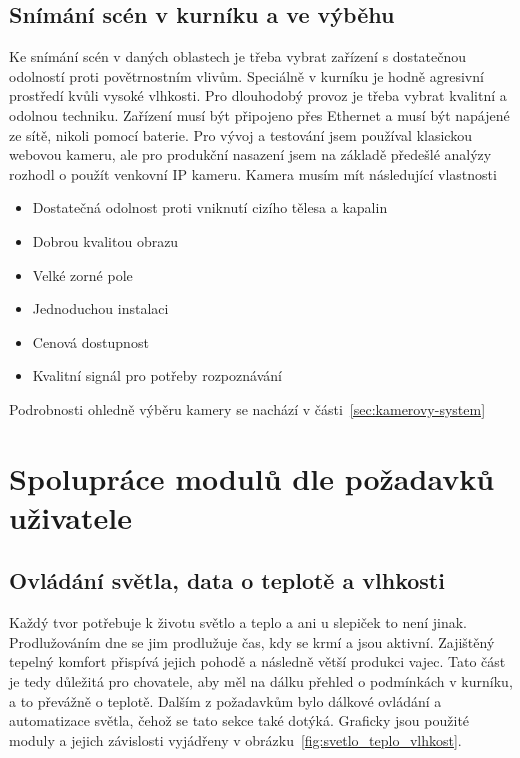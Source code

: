 \subsection{Snímání scén v kurníku a ve výběhu}
Ke snímání scén v daných oblastech je třeba vybrat zařízení s dostatečnou odolností proti povětrnostním vlivům.
Speciálně v kurníku je hodně agresivní prostředí kvůli vysoké vlhkosti.
Pro dlouhodobý provoz je třeba vybrat kvalitní a odolnou techniku.
Zařízení musí být připojeno přes Ethernet a musí být napájené ze sítě, nikoli pomocí baterie.
Pro vývoj a testování jsem používal klasickou webovou kameru, ale pro produkční nasazení jsem na základě předešlé analýzy rozhodl o použít venkovní IP kameru.
Kamera musím mít následující vlastnosti
\begin{itemize}
    \item Dostatečná odolnost proti vniknutí cizího tělesa a kapalin
    \item Dobrou kvalitou obrazu
    \item Velké zorné pole
    \item Jednoduchou instalaci
    \item Cenová dostupnost
    \item Kvalitní signál pro potřeby rozpoznávání
\end{itemize}
Podrobnosti ohledně výběru kamery se nachází v části~\ref{sec:kamerovy-system}

\clearpage
\section{Spolupráce modulů dle požadavků uživatele}\label{sec:schematicka-vyjadreni-zavislosti-jednotlivych-modulu}

\subsection{Ovládání světla, data o teplotě a vlhkosti}
Každý tvor potřebuje k životu světlo a teplo a ani u slepiček to není jinak.
Prodlužováním dne se jim prodlužuje čas, kdy se krmí a jsou aktivní.
Zajištěný tepelný komfort přispívá jejich pohodě a následně větší produkci vajec.
Tato část je tedy důležitá pro chovatele, aby měl na dálku přehled o podmínkách v kurníku, a to převážně o teplotě.
Dalším z požadavkům bylo dálkové ovládání a automatizace světla, čehož se tato sekce také dotýká.
Graficky jsou použité moduly a jejich závislosti vyjádřeny v obrázku~\ref{fig:svetlo_teplo_vlhkost}.\newline

